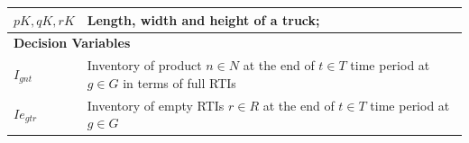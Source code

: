 \begin{longtable}[hbt!]{  |p{}|p{}  |}
  $p{K}, q{K}, r{K}$                                                                             & Length, width and height of a truck;                                                                                                                                                                                                                                                                                                                                                                                                                                                                                                                                           \\[0.15cm]
  \hline
  \multicolumn{2}{|l|}{\textbf{Decision Variables}}                                                                                                                                                                                                                                                                                                                                                                                                                                                                                                                                                                                                                               \\ \hline
  $I_{gnt}$                                                                                      & Inventory of product $n\in N$ at the end of $t\in T$ time period at $g\in G$ in terms of full RTIs                                                                                                                                                                                                                                                                                                                                                                                                                                                                             \\
  $Ie_{gtr}$                                                                                     & Inventory of empty RTIs $r\in R$ at the end of $t\in T$ time period at $g\in G$                                                                                                                                                                                                                                                                                                                                                                                                                                                                                                \\

\end{longtable}
